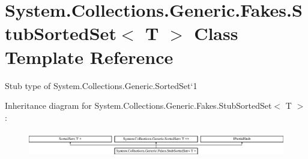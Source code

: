 \hypertarget{class_system_1_1_collections_1_1_generic_1_1_fakes_1_1_stub_sorted_set_3_01_t_01_4}{\section{System.\-Collections.\-Generic.\-Fakes.\-Stub\-Sorted\-Set$<$ T $>$ Class Template Reference}
\label{class_system_1_1_collections_1_1_generic_1_1_fakes_1_1_stub_sorted_set_3_01_t_01_4}
}


Stub type of System.\-Collections.\-Generic.\-Sorted\-Set`1 


Inheritance diagram for System.\-Collections.\-Generic.\-Fakes.\-Stub\-Sorted\-Set$<$ T $>$\-:\begin{figure}[H]
\begin{center}
\leavevmode
\includegraphics[height=1.138211cm]{class_system_1_1_collections_1_1_generic_1_1_fakes_1_1_stub_sorted_set_3_01_t_01_4}
\end{center}
\end{figure}
